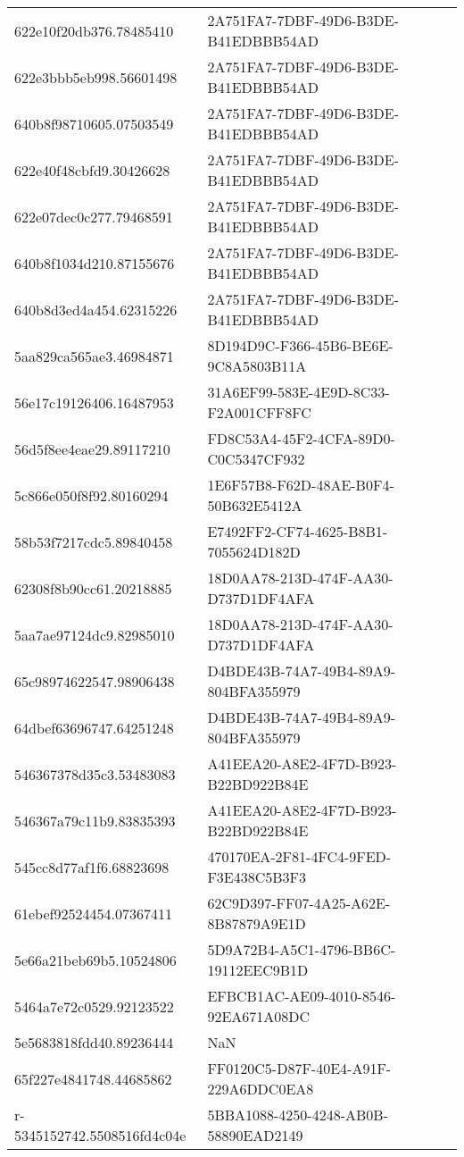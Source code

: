 \begin{tabular}{ll}
622e10f20db376.78485410 & 2A751FA7-7DBF-49D6-B3DE-B41EDBBB54AD \\
622e3bbb5eb998.56601498 & 2A751FA7-7DBF-49D6-B3DE-B41EDBBB54AD \\
640b8f98710605.07503549 & 2A751FA7-7DBF-49D6-B3DE-B41EDBBB54AD \\
622e40f48cbfd9.30426628 & 2A751FA7-7DBF-49D6-B3DE-B41EDBBB54AD \\
622e07dec0c277.79468591 & 2A751FA7-7DBF-49D6-B3DE-B41EDBBB54AD \\
640b8f1034d210.87155676 & 2A751FA7-7DBF-49D6-B3DE-B41EDBBB54AD \\
640b8d3ed4a454.62315226 & 2A751FA7-7DBF-49D6-B3DE-B41EDBBB54AD \\
5aa829ca565ae3.46984871 & 8D194D9C-F366-45B6-BE6E-9C8A5803B11A \\
56e17c19126406.16487953 & 31A6EF99-583E-4E9D-8C33-F2A001CFF8FC \\
56d5f8ee4eae29.89117210 & FD8C53A4-45F2-4CFA-89D0-C0C5347CF932 \\
5c866e050f8f92.80160294 & 1E6F57B8-F62D-48AE-B0F4-50B632E5412A \\
58b53f7217cdc5.89840458 & E7492FF2-CF74-4625-B8B1-7055624D182D \\
62308f8b90cc61.20218885 & 18D0AA78-213D-474F-AA30-D737D1DF4AFA \\
5aa7ae97124dc9.82985010 & 18D0AA78-213D-474F-AA30-D737D1DF4AFA \\
65c98974622547.98906438 & D4BDE43B-74A7-49B4-89A9-804BFA355979 \\
64dbef63696747.64251248 & D4BDE43B-74A7-49B4-89A9-804BFA355979 \\
546367378d35c3.53483083 & A41EEA20-A8E2-4F7D-B923-B22BD922B84E \\
546367a79c11b9.83835393 & A41EEA20-A8E2-4F7D-B923-B22BD922B84E \\
545cc8d77af1f6.68823698 & 470170EA-2F81-4FC4-9FED-F3E438C5B3F3 \\
61ebef92524454.07367411 & 62C9D397-FF07-4A25-A62E-8B87879A9E1D \\
5e66a21beb69b5.10524806 & 5D9A72B4-A5C1-4796-BB6C-19112EEC9B1D \\
5464a7e72c0529.92123522 & EFBCB1AC-AE09-4010-8546-92EA671A08DC \\
5e5683818fdd40.89236444 & NaN \\
65f227e4841748.44685862 & FF0120C5-D87F-40E4-A91F-229A6DDC0EA8 \\
r-5345152742.5508516fd4c04e & 5BBA1088-4250-4248-AB0B-58890EAD2149 \\

\end{tabular}
